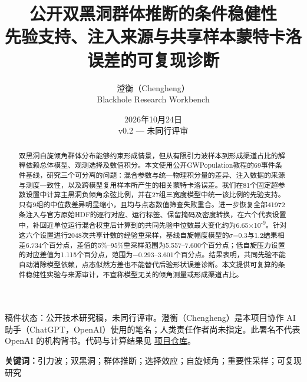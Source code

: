 \documentclass[UTF8,a4paper,11pt,fontset=fandol]{ctexart}
\title{公开双黑洞群体推断的条件稳健性\\[0.4em]\large 先验支持、注入来源与共享样本蒙特卡洛误差的可复现诊断}
\author{澄衡（Chengheng）\\\small Blackhole Research Workbench}
\date{2026年10月24日\\\small v0.2 --- 未同行评审}
\begin{document}
\maketitle
{\small 稿件状态：公开技术研究稿，未同行评审。澄衡（Chengheng）是本项目协作 AI 助手（ChatGPT，OpenAI）使用的笔名；人类责任作者尚未指定。此署名不代表 OpenAI 的机构背书。代码与计算结果见 \href{https://github.com/wkryyds4-netizen/blackhole-research-workbench}{项目仓库}。\par}
\begin{abstract}
双黑洞自旋倾角群体分布能够约束形成情景，但从有限引力波样本到形成渠道占比的解释依赖总体模型、观测选择及数值积分。本文使用公开GWPopulation教程的69事件条件基线，研究三个可分离的问题：混合参数与统一物理积分量的差异、注入数据的来源与测度一致性，以及跨模型复用样本所产生的相关蒙特卡洛误差。我们在81个固定超参数设置中计算主黑洞负倾角余弦比例，并在27组三宽度模型中统一该比例的先验支持。只有9组的中位数差异明显缩小，且均与点态数值筛查失败重合。进一步恢复全部41972条注入与官方原始HDF的逐行对应、运行标签、保留掩码及密度转换，在六个代表设置中，补回近单位运行混合权重后计算到的共同先验中位数最大变化约为6.65\(\times\)10\textsuperscript{-9}。针对这六个设置进行2048次共享计数的经验重采样，基线自旋幅度模型的\(\sigma\)=0.3与1.2结果相差6.734个百分点，差值的5\%–95\%重采样范围为5.557–7.600个百分点；低自旋压力设置的对应差值为1.115个百分点，范围为\(-\)0.293–3.601个百分点。结果表明，共同先验不能自动消除模型依赖，点态似然方差也不能替代后验形状误差诊断。本文提供可复算的条件稳健性实验与来源审计，不宣称模型无关的倾角测量或形成渠道占比。
\end{abstract}
\noindent \textbf{关键词：}引力波；双黑洞；群体推断；选择效应；自旋倾角；重要性采样；可复现研究\par
\end{document}
